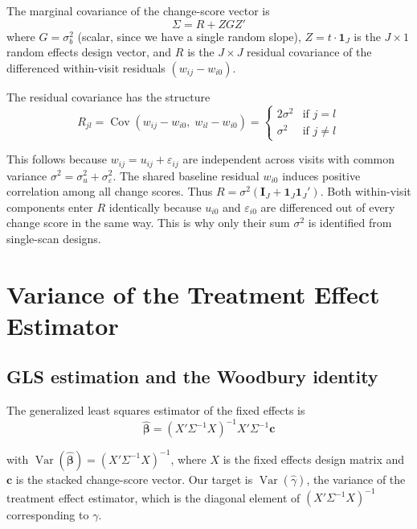 \documentclass[
  11pt,
]{article}
\begin{document}
The marginal covariance of the change-score vector is
\begin{equation}
  \Sigma = R + Z G Z'
  \label{eq:sigma}
\end{equation}
where \(G = \sigma_b^2\) (scalar, since we have a single random
slope), \(Z = t \cdot \mathbf{1}_J\) is the \(J \times 1\) random
effects design vector, and \(R\) is the \(J \times J\) residual
covariance of the differenced within-visit residuals
\((w_{ij} - w_{i0})\).

The residual covariance has the structure
\begin{equation}
  R_{jl} = \mathop{\mathrm{Cov}}(w_{ij} - w_{i0},\; w_{il} - w_{i0})
  = \begin{cases}
    2\sigma^2 & \text{if } j = l \\
    \sigma^2  & \text{if } j \ne l
  \end{cases}
  \label{eq:R}
\end{equation}

This follows because \(w_{ij} = u_{ij} + \varepsilon_{ij}\)
are independent across visits with common variance
\(\sigma^2 = \sigma_u^2 + \sigma_\varepsilon^2\). The shared
baseline residual \(w_{i0}\) induces positive correlation among
all change scores. Thus
\(R = \sigma^2(\mathbf{I}_J + \mathbf{1}_J \mathbf{1}_J')\).
Both within-visit components enter \(R\) identically because
\(u_{i0}\) and \(\varepsilon_{i0}\) are differenced out of every
change score in the same way. This is why only their sum
\(\sigma^2\) is identified from single-scan designs.

\section{Variance of the Treatment Effect Estimator}\label{variance-of-the-treatment-effect-estimator}

\subsection{GLS estimation and the Woodbury identity}\label{gls-estimation-and-the-woodbury-identity}

The generalized least squares estimator of the fixed effects
is
\begin{equation}
  \hat{\boldsymbol{\beta}} = (X' \Sigma^{-1} X)^{-1} X' \Sigma^{-1}
  \mathbf{c}
  \label{eq:gls}
\end{equation}

with \(\mathop{\mathrm{Var}}(\hat{\boldsymbol{\beta}}) = (X' \Sigma^{-1} X)^{-1}\),
where \(X\) is the fixed effects design matrix and \(\mathbf{c}\)
is the stacked change-score vector. Our target is
\(\mathop{\mathrm{Var}}(\hat{\gamma})\), the variance of the treatment effect
estimator, which is the diagonal element of
\((X' \Sigma^{-1} X)^{-1}\) corresponding to \(\gamma\).
\end{document}
